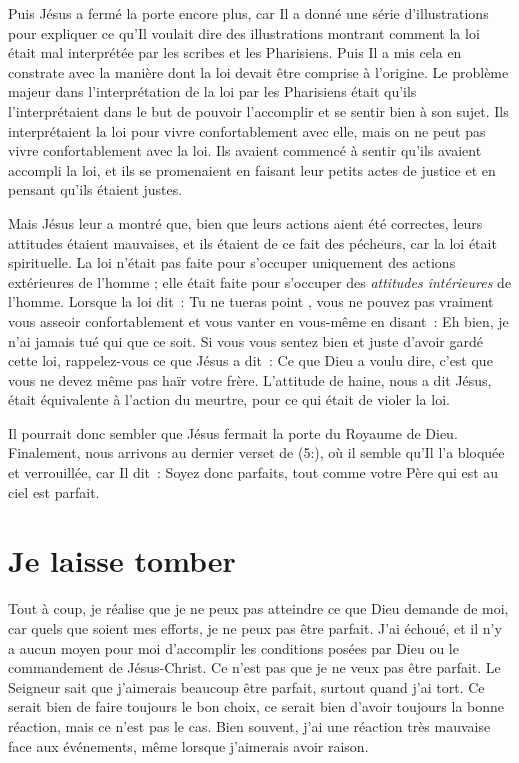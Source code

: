 Puis Jésus a fermé la porte encore plus,
 car Il a donné une série d'illustrations pour expliquer
 ce qu'Il voulait dire \ocadr des illustrations montrant comment la loi
 était mal interprétée par les scribes et les Pharisiens.
 Puis Il a mis cela en constrate avec la manière dont la loi
 devait être comprise à l'origine.
 Le problème majeur dans l'interprétation de la loi par les Pharisiens
 était qu'ils l'interprétaient dans le but de pouvoir l'accomplir
 et se sentir bien à son sujet.
 Ils interprétaient la loi pour vivre confortablement avec elle,
 mais on ne peut pas vivre confortablement avec la loi.
 Ils avaient commencé à sentir qu'ils avaient accompli la loi,
 et ils se promenaient en faisant leur petits actes de justice
 et en pensant qu'ils étaient justes.

Mais Jésus leur a montré que, bien que leurs actions
 aient été correctes, leurs attitudes étaient mauvaises,
 et ils étaient de ce fait des pécheurs,
 car la loi était spirituelle.
 La loi n'était pas faite pour s'occuper uniquement des actions extérieures
 de l'homme ; elle était faite pour s'occuper
 des \emph{attitudes intérieures} de l'homme.
 Lorsque la loi dit~: \og Tu ne tueras point \fg{},
 vous ne pouvez pas vraiment vous asseoir confortablement et vous vanter
 en vous-même en disant~:
 \og Eh bien, je n'ai jamais tué qui que ce soit. \fg{}
 Si vous vous sentez bien et juste d'avoir gardé cette loi,
 rappelez-vous ce que Jésus a dit~:
 \og Ce que Dieu a voulu dire, c'est que vous ne devez même pas
 haïr votre frère. \fg{}
 L'attitude de haine, nous a dit Jésus,
 était équivalente à l'action du meurtre,
 pour ce qui était de violer la loi.

Il pourrait donc sembler que Jésus fermait la porte du Royaume de Dieu.
 Finalement, nous arrivons au dernier verset de (5:),
 où il semble qu'Il l'a bloquée et verrouillée, car Il dit~:
 \og Soyez donc parfaits,
 tout comme votre Père qui est au ciel est parfait. \fg{}


\section*{Je laisse tomber}

Tout à coup, je réalise que je ne peux pas atteindre
 ce que Dieu demande de moi, car quels que soient mes efforts,
 je ne peux pas être parfait.
 J'ai échoué, et il n'y a aucun moyen pour moi d'accomplir
 les conditions posées par Dieu ou le commandement de Jésus-Christ.
 Ce n'est pas que je ne veux pas être parfait.
 Le Seigneur sait que j'aimerais beaucoup être parfait,
 surtout quand j'ai tort.
 Ce serait bien de faire toujours le bon choix,
 ce serait bien d'avoir toujours la bonne réaction,
 mais ce n'est pas le cas.
 Bien souvent, j'ai une réaction très mauvaise face aux événements,
 même lorsque j'aimerais avoir raison.

